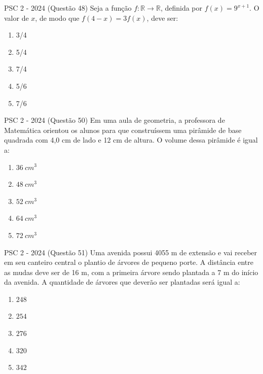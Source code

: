 \documentclass[aspectratio=169]{beamer}
\newif\ifusarcorvermelha
\newcommand{\vermelho}[1]{%
    \ifusarcorvermelha
        {\color{red}#1}%
    \else
        #1%
    \fi
}
\begin{document}
    \begin{frame}{PSC 2 - 2024 (Questão 48)}
        Seja a função $f: \mathbb{R} \to \mathbb{R}$, definida por $f(x)=9^{x+1}$. O valor de $x$, de modo que $f(4-x)=3f(x)$, deve ser:
        
            \begin{enumerate}[a]
                \item {3}/{4}
                \item {5}/{4}
                \item \vermelho{{7}/{4}} %
                \item {5}/{6}
                \item {7}/{6}
            \end{enumerate}
            
    \end{frame}

    \begin{frame}{PSC 2 - 2024 (Questão 50)}
        Em uma aula de geometria, a professora de Matemática orientou os alunos para que construíssem uma pirâmide de base quadrada com 4,0 cm de lado e 12 cm de altura. O volume dessa pirâmide é igual a:

         \begin{enumerate}[a]
                    \item $36 \ cm^{3}$
                    \item $48 \ cm^{3}$
                    \item $52 \ cm^{3}$
                    \item \vermelho{$64 \ cm^{3}$} %
                    \item $72 \ cm^{3}$
                \end{enumerate}        
    \end{frame}

    \begin{frame}{PSC 2 - 2024 (Questão 51)}
        Uma avenida possui 4055 m de extensão e vai receber em seu canteiro central o plantio de árvores de pequeno porte. A distância entre as mudas deve ser de 16 m, com a primeira árvore sendo plantada a 7 m do início da avenida. A quantidade de árvores que deverão ser plantadas será igual a:


         \begin{enumerate}[a]
                    \item $248$
                    \item \vermelho{$254$} %
                    \item $276$
                    \item $320$ 
                    \item $342$
                \end{enumerate}        
    \end{frame}
\end{document}
